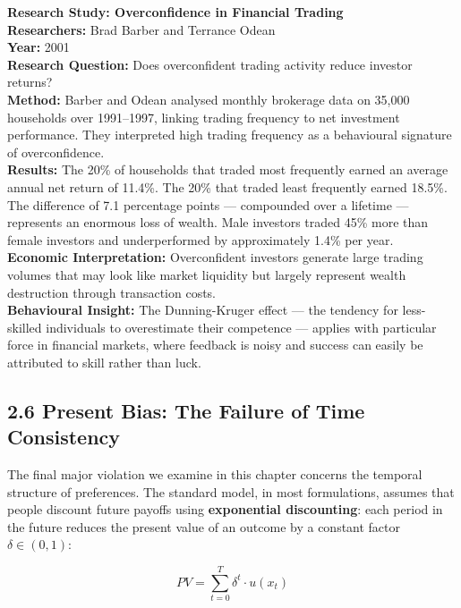 \documentclass[12pt, letterpaper]{article}
\begin{document}
\begin{researchbox}
\textbf{Research Study: Overconfidence in Financial Trading}\\[4pt]

\textbf{Researchers:} Brad Barber and Terrance Odean\\[4pt]
\textbf{Year:} 2001\\[4pt]
\textbf{Research Question:} Does overconfident trading activity reduce investor returns?\\[4pt]
\textbf{Method:} Barber and Odean analysed monthly brokerage data on 35,000 households over 1991--1997, linking trading frequency to net investment performance. They interpreted high trading frequency as a behavioural signature of overconfidence.\\[4pt]
\textbf{Results:} The 20\% of households that traded most frequently earned an average annual net return of 11.4\%. The 20\% that traded least frequently earned 18.5\%. The difference of 7.1 percentage points --- compounded over a lifetime --- represents an enormous loss of wealth. Male investors traded 45\% more than female investors and underperformed by approximately 1.4\% per year.\\[4pt]
\textbf{Economic Interpretation:} Overconfident investors generate large trading volumes that may look like market liquidity but largely represent wealth destruction through transaction costs.\\[4pt]
\textbf{Behavioural Insight:} The Dunning-Kruger effect --- the tendency for less-skilled individuals to overestimate their competence --- applies with particular force in financial markets, where feedback is noisy and success can easily be attributed to skill rather than luck.\\[4pt]
\end{researchbox}

\medskip


\subsection{2.6 Present Bias: The Failure of Time Consistency}


The final major violation we examine in this chapter concerns the temporal structure of preferences. The standard model, in most formulations, assumes that people discount future payoffs using \textbf{exponential discounting}: each period in the future reduces the present value of an outcome by a constant factor $\delta \in (0,1)$:

$$PV = \sum_{t=0}^{T} \delta^t \cdot u(x_t)$$
\end{document}
